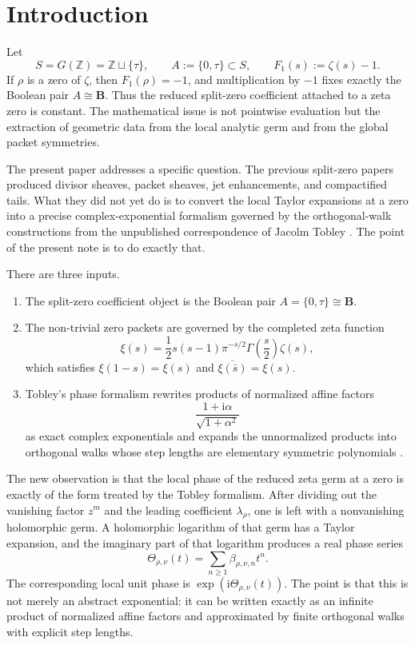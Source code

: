 \documentclass[11pt]{amsart}
\numberwithin{equation}{section}
\theoremstyle{definition}
\theoremstyle{remark}
\newcommand{\ZZ}{\mathbb Z}
\newcommand{\BB}{\mathbf B}
\newcommand{\taup}{\tau}
\newcommand{\ii}{\mathrm i}
\begin{document}
\tableofcontents

\section{Introduction}

Let
\[
S=G(\ZZ)=\ZZ\sqcup\{\taup\},
\qquad
A:=\{0,\taup\}\subset S,
\qquad
F_1(s):=\zeta(s)-1.
\]
If $\rho$ is a zero of $\zeta$, then $F_1(\rho)=-1$, and multiplication by $-1$ fixes exactly the Boolean pair $A\cong\BB$.  Thus the reduced split-zero coefficient attached to a zeta zero is constant.  The mathematical issue is not pointwise evaluation but the extraction of geometric data from the local analytic germ and from the global packet symmetries.

The present paper addresses a specific question.  The previous split-zero papers produced divisor sheaves, packet sheaves, jet enhancements, and compactified tails.  What they did not yet do is to convert the local Taylor expansions at a zero into a precise complex-exponential formalism governed by the orthogonal-walk constructions from the unpublished correspondence of Jacolm Tobley \cite{Tobley}.  The point of the present note is to do exactly that.

There are three inputs.
\begin{enumerate}[label=(\roman*)]
\item The split-zero coefficient object is the Boolean pair $A=\{0,\taup\}\cong\BB$.
\item The non-trivial zero packets are governed by the completed zeta function
\[
\xi(s)=\frac12 s(s-1)\pi^{-s/2}\Gamma\!\left(\frac s2\right)\zeta(s),
\]
which satisfies $\xi(1-s)=\xi(s)$ and $\overline{\xi(\bar s)}=\xi(s)$.
\item Tobley's phase formalism rewrites products of normalized affine factors
\[
\frac{1+\ii\alpha}{\sqrt{1+\alpha^2}}
\]
as exact complex exponentials and expands the unnormalized products into orthogonal walks whose step lengths are elementary symmetric polynomials \cite{Tobley}.
\end{enumerate}

The new observation is that the local phase of the reduced zeta germ at a zero is exactly of the form treated by the Tobley formalism.  After dividing out the vanishing factor $z^m$ and the leading coefficient $\lambda_\rho$, one is left with a nonvanishing holomorphic germ.  A holomorphic logarithm of that germ has a Taylor expansion, and the imaginary part of that logarithm produces a real phase series
\[
\Theta_{\rho,\nu}(t)=\sum_{n\ge 1}\beta_{\rho,\nu,n}t^n.
\]
The corresponding local unit phase is $\exp(\ii\Theta_{\rho,\nu}(t))$.  The point is that this is not merely an abstract exponential: it can be written exactly as an infinite product of normalized affine factors and approximated by finite orthogonal walks with explicit step lengths.
\end{document}
